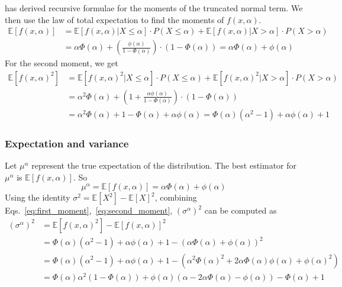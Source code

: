 \documentclass[11pt]{article}
\newcommand{\E}{\mathbb{E}}
\newcommand{\lp}{\left(}
\newcommand{\rp}{\right)}
\renewcommand{\a}{\alpha}
\begin{document}
\cite{recursive_moments} has derived recursive formulae for the moments of the truncated normal term. We then use the law of total expectation to find the moments of $f(x, \alpha)$. 
\begin{equation}\label{eq:first_moment}
\begin{aligned}
\E[f(x, \alpha)] &= \E[f(x, \alpha) | X \leq \alpha]\cdot P (X \leq \alpha) + \E[f(x, \alpha) | X > \alpha]\cdot P (X > \alpha) \\
&=\alpha \Phi(\alpha) + \left( \frac{\phi(\alpha)}{1-\Phi(\alpha)}\right)\cdot(1-\Phi(\alpha)) = \alpha \Phi(\alpha) + \phi(\alpha)
\end{aligned}
\end{equation}
For the second moment, we get
\begin{equation}\label{eq:second_moment}
    \begin{aligned}
\E[f(x, \alpha)^2] &= \E[f(x, \alpha)^2 | X \leq \alpha]\cdot P (X \leq \alpha) + \E[f(x, \alpha)^2 | X > \alpha]\cdot P (X > \alpha) \\
&=\alpha^2 \Phi(\alpha) + \left( 1+\frac{\alpha\phi(\alpha)}{1-\Phi(\alpha)}\right)\cdot(1-\Phi(\alpha)) \\
&= \alpha^2 \Phi(\alpha) + 1-\Phi(\alpha) +\alpha\phi(\alpha)=\Phi(\alpha)(\alpha^2-1)+\alpha\phi(\alpha)+1
\end{aligned}
\end{equation}

\subsubsection{Expectation and variance}
Let $\mu^\alpha$ represent the true expectation of the distribution. The best estimator for $\mu^\alpha$ is $\E[f(x, \alpha)]$. So
\begin{equation}\label{eq:censored_mu}
   \mu^\alpha = \E[f(x, \alpha)] = \a\Phi(\a)+\phi(\a) 
\end{equation}
Using the identity $\sigma^2 = \E[X^2] -\E[X]^2$, combining Eqs.~\ref{eq:first_moment},~\ref{eq:second_moment}, $\left(\sigma^\alpha \right)^2$ can be computed as
\begin{equation}\label{eq:censored_var}
\begin{aligned}
\left(\sigma^\alpha \right)^2 &= \E[f(x, \alpha)^2] -\E[f(x, \alpha)]^2 \\
&= \Phi(\alpha)(\alpha^2-1)+\alpha\phi(\alpha)+1 - \lp \alpha \Phi(\alpha) + \phi(\alpha) \rp^2 \\
&= \Phi(\alpha)(\alpha^2-1)+\alpha\phi(\alpha)+1 - \lp\alpha^2 \Phi(\alpha)^2 + 2\alpha \Phi(\alpha)\phi(\alpha) + \phi(\alpha)^2\rp \\
&=  \Phi(\a)\a^2(1-\Phi(\a)) + \phi(\a)(\a-2\a \Phi(\a)-\phi(\a))-\Phi(\a)+1
\end{aligned}
\end{equation}
\end{document}
